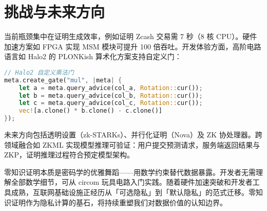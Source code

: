 \chapter{挑战与未来方向}
当前瓶颈集中在证明生成效率，例如证明 Zcash 交易需 7 秒（8 核 CPU）。硬件加速方案如 FPGA 实现 MSM 模块可提升 100 倍吞吐。开发体验方面，高阶电路语言如 Halo2 的 PLONKish 算术化方案支持自定义门：\par
\begin{lstlisting}[language=rust]
// Halo2 自定义乘法门
meta.create_gate("mul", |meta| {
    let a = meta.query_advice(col_a, Rotation::cur());
    let b = meta.query_advice(col_b, Rotation::cur());
    let c = meta.query_advice(col_c, Rotation::cur());
    vec![a.clone() * b.clone() - c.clone()]
});
\end{lstlisting}
未来方向包括透明设置（zk-STARKs）、并行化证明（Nova）及 ZK 协处理器。跨领域融合如 ZKML 实现模型推理可验证：用户提交预测请求，服务端返回结果与 ZKP，证明推理过程符合预定模型架构。\par
零知识证明本质是密码学的优雅舞蹈——用数学约束替代数据暴露。开发者无需理解全部数学细节，可从 circom 玩具电路入门实践。随着硬件加速突破和开发者工具成熟，互联网基础设施正经历从「可选隐私」到「默认隐私」的范式迁移。零知识证明作为隐私计算的基石，将持续重塑我们对数据价值的认知边界。\par
